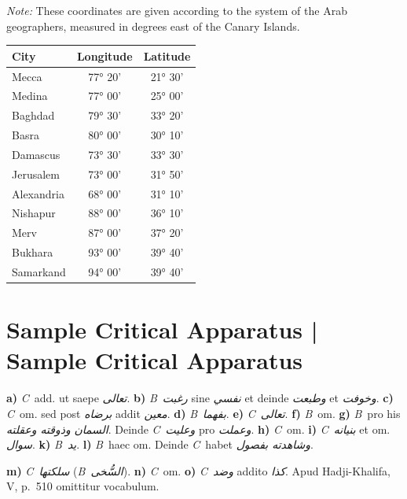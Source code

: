 \documentclass[11pt,a4paper]{article}
\newcommand{\ar}[1]{{\arabicfont\beginR #1\endR}}
\newcommand{\B}{\textit{B}}
\newcommand{\C}{\textit{C}}
\begin{document}
\textit{Note:} These coordinates are given according to the system of the Arab geographers, measured in degrees east of the Canary Islands.

\vspace{0.2cm}

\begin{center}
\begin{longtable}{lcc}
\toprule
\textbf{City} & \textbf{Longitude} & \textbf{Latitude} \\
\midrule
\endhead
Mecca & 77° 20' & 21° 30' \\
Medina & 77° 00' & 25° 00' \\
Baghdad & 79° 30' & 33° 20' \\
Basra & 80° 00' & 30° 10' \\
Damascus & 73° 30' & 33° 30' \\
Jerusalem & 73° 00' & 31° 50' \\
Alexandria & 68° 00' & 31° 10' \\
Nishapur & 88° 00' & 36° 10' \\
Merv & 87° 00' & 37° 20' \\
Bukhara & 93° 00' & 39° 40' \\
Samarkand & 94° 00' & 39° 40' \\
\bottomrule
\end{longtable}
\end{center}

\clearpage


\section{Sample Critical Apparatus | Sample Critical Apparatus}

\begin{footnotesize}
\noindent\textbf{a)} \C\ add. ut saepe \textit{\ar{تعالى}}. \textbf{b)} \B\ \textit{\ar{رغبت}} sine \textit{\ar{نفسي}} et deinde \textit{\ar{وطبعت}} et \textit{\ar{وخوفت}}. \textbf{c)} \C\ om. sed post \textit{\ar{برضاه}} addit \textit{\ar{معين}}. \textbf{d)} \B\ \textit{\ar{بفهما}}. \textbf{e)} \C\ \textit{\ar{تعالى}}. \textbf{f)} \B\ om. \textbf{g)} \B\ pro his \textit{\ar{السمان}} \textit{\ar{وذوقته وعقلته}}. Deinde \C\ \textit{\ar{وعليت}} pro \textit{\ar{وعملت}}. \textbf{h)} \C\ om. \textbf{i)} \C\ \textit{\ar{بنيانه}} et om. \textit{\ar{سوال}}. \textbf{k)} \B\ \textit{\ar{يد}}. \textbf{l)} \B\ haec om. Deinde \C\ habet \textit{\ar{وشاهدته بفصول}}.

\vspace{0.2cm}

\noindent\textbf{m)} \C\ \textit{\ar{سلكتها}} (\B\ \textit{\ar{السُّخى}}). \textbf{n)} \C\ om. \textbf{o)} \C\ \textit{\ar{وضد}} addito \textit{\ar{كذا}}. Apud Hadji-Khalifa, V, p.~510 omittitur vocabulum.
\end{footnotesize}
\end{document}
